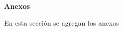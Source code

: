 \thispagestyle{plain}
\begin{center}
	\Large    
	\vspace{0.9cm}
	\textbf{Anexos}
\end{center}
En esta sección se agregan los anexos